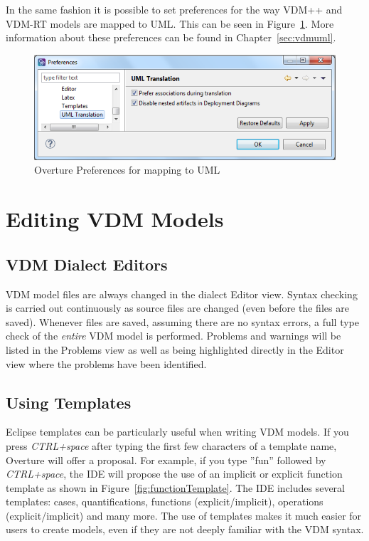 \documentclass{overturerepchap}
\begin{document}
In the same fashion it is possible to set preferences for the way VDM++ and VDM-RT models are mapped to UML. 
This can be seen in Figure~\ref{fig:UMLpreferences}. More information about 
these preferences can be found in Chapter~\ref{sec:vdmuml}.

\begin{figure}[!hbt]
\begin{center}
  \includegraphics[width=\textwidth]{screenDumps/UMLpreferences}
  \caption{Overture Preferences for mapping to UML}
  \label{fig:UMLpreferences}
\end{center}
\end{figure}

\chapter{Editing VDM Models}\label{sec:editVDM}

\section{VDM Dialect Editors}

VDM model files are always changed in the dialect Editor view. Syntax checking
is carried out continuously as source files are
changed (even before the files are saved). Whenever files are saved, assuming
there are no syntax errors, a full type check of the \emph{entire} VDM model is
performed.
Problems and warnings will be listed in the Problems view as well as
being highlighted directly in the Editor view where the problems have been
identified.


\section{Using Templates}\label{sec:templates}

Eclipse templates can be particularly useful when writing VDM models. If you
press \textit{CTRL+space} after typing the first few characters of a template name,
Overture will offer a proposal. For example, if you type ''fun'' followed
by \textit{CTRL+space}, the IDE will propose the use of an implicit or explicit
function template as shown in Figure~\ref{fig:functionTemplate}. The IDE includes
several templates: cases, quantifications, functions (explicit/implicit),
operations (explicit/implicit) and many more. The use of templates makes it much
easier for users to create models, even if they are not deeply familiar
with the VDM syntax.
\end{document}
